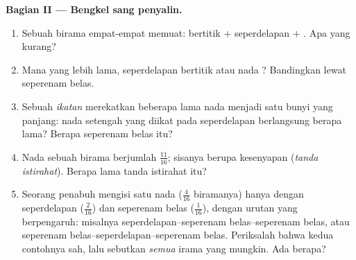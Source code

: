 \begin{problem}
\medskip
\noindent\textbf{Bagian II --- Bengkel sang penyalin.}
\begin{enumerate}[resume]
  \item Sebuah birama empat-empat memuat:  bertitik $+$
        seperdelapan $+$ . Apa yang kurang?
  \item Mana yang lebih lama, seperdelapan bertitik atau nada
        ? Bandingkan lewat seperenam belas.
  \item Sebuah \emph{ikatan} merekatkan beberapa lama nada menjadi satu
        bunyi yang panjang: nada setengah yang diikat pada seperdelapan
        berlangsung berapa lama? Berapa seperenam belas itu?
  \item Nada sebuah birama berjumlah $\frac{11}{16}$; sisanya berupa
        kesenyapan (\emph{tanda istirahat}). Berapa lama tanda
        istirahat itu?
  \item Seorang penabuh mengisi satu nada  ($\frac{4}{16}$
        biramanya) hanya dengan seperdelapan ($\frac{2}{16}$) dan
        seperenam belas ($\frac{1}{16}$), dengan urutan yang
        berpengaruh: misalnya
        seperdelapan--seperenam belas--seperenam belas, atau
        seperenam belas--seperdelapan--seperenam belas. Periksalah
        bahwa kedua contohnya sah, lalu sebutkan \emph{semua} irama
        yang mungkin. Ada berapa?
\end{enumerate}


\end{problem}
